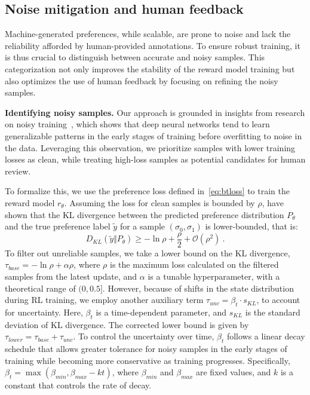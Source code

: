 \subsection{Noise mitigation and human feedback} \label{sec:method_sample_select}
Machine-generated preferences, while scalable, are prone to noise and lack the reliability afforded by human-provided annotations. 
To ensure robust training, it is thus crucial to distinguish between accurate and noisy samples. 
This categorization not only improves the stability of the reward model training but also optimizes the use of human feedback by focusing on refining the noisy samples. 

\noindent \textbf{Identifying noisy samples.} Our approach is grounded in insights from research on noisy training~\cite{li2020gradient,cheng2024rime}, which shows that deep neural networks tend to learn generalizable patterns in the early stages of training before overfitting to noise in the data. Leveraging this observation, we prioritize samples with lower training losses as clean, while treating high-loss samples as potential candidates for human review. 

To formalize this, we use the preference loss defined in~\eqref{eq:btloss} to train the reward model $r_\theta$. 
Assuming the loss for clean samples is bounded by $\rho$, \citet{cheng2024rime} have shown that the KL divergence between the predicted preference distribution $P_{\theta}$ and the true preference label $\tilde{y}$ for a sample $(\sigma_0, \sigma_1)$ is lower-bounded, that is:
\begin{equation}\label{eq:KL_div} 
    D_{KL}(\tilde{y}\Vert P_\theta) \geq -\ln{\rho} + \frac{\rho}{2} + \mathcal{O}(\rho^2) \ . \end{equation}
%
To filter out unreliable samples, we take a lower bound on the KL divergence, $\tau_{base} = -\ln{\rho} + \alpha \rho$, where $\rho$ is the maximum loss calculated on the filtered samples from the latest update, and $\alpha$ is a tunable hyperparameter, with a theoretical range of $(0, 0.5]$. 
However, because of shifts in the state distribution during RL training, we employ another auxiliary term $\tau_{unc} = \beta_{t} \cdot s_{KL}$, to account for uncertainty. 
Here, $\beta_{t}$ is a time-dependent parameter, and $s_{KL}$ is the standard deviation of KL divergence. 
The corrected lower bound is given by $\tau_{lower} = \tau_{base} + \tau_{unc}$. 
To control the uncertainty over time, $\beta_t$ follows a linear decay schedule that allows greater tolerance for noisy samples in the early stages of training while becoming more conservative as training progresses. 
Specifically, $\beta_t = \max(\beta_{min}, \beta_{max} - kt)$, where $\beta_{min}$ and $\beta_{max}$ are fixed values, and $k$ is a constant that controls the rate of decay. 

